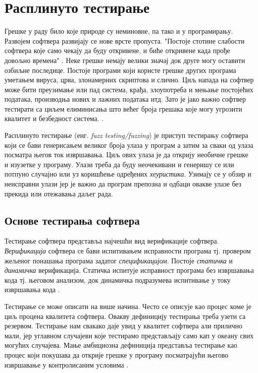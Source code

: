 \documentclass[12pt,oneside]{memoir}
\begin{document}
\chapter{Расплинуто тестирање}

Грешке у раду било које природе су неминовне, па тако и у програмирању. Развојем софтвера развијају се нове врсте пропуста. "Постоје стотине слабости софтвера које само чекају да буду откривене, и биће откривене када прође довољно времена" \cite{fuzzing}. Неке грешке немају велики значај док друге могу оставити озбиљне последице. Постоје програми који користе грешке других програма уметањем вируса, црва, злонамерних скриптова и слично. Циљ напада на софтвер може бити преузимање или пад система, крађа, злоупотреба и мењање постојећих података, производња нових и лажних података итд.  Зато је јако важно софтвер тестирати са циљем елиминисања што већег броја грешака које могу угрозити квалитет и безбедност система. \cite{fuzzing, bezbMalkov}.

Расплинуто тестирање (енг. \textit{fuzz testing/fuzzing}) је приступ тестирању софтвера који се бави генерисањем великог броја улаза у програм а затим за сваки од улаза посматра његов ток извршавања. Циљ ових улаза је да открију необичне грешке и изузетке у програму. Улази треба да буду неочекивани и генеришу се или потпуно случајно или уз коришћење одређених \textit{хеуристика}. Узимају се у обзир и неисправни улази јер је важно да програм препозна и одбаци овакве улазе без прекида или отежавања даљег рада. %

\section{Основе тестирања софтвера}

Тестирање софтвера представља најчешћи вид верификације софтвера. \textit{Верификација} софтвера се бави испитивањем исправности програма тј. провером жељеног понашања програма задатог \textit{спецификацијом}. Постоје \textit{статичка} и \textit{динамичка} верификација. Статичка испитује исправност програма без извршавања кода тј. његовом анализом, док динамичка подразумева испитивање у току извршавања кода \cite{milenaDokt}. 

Тестирање се може описати на више начина. Често се описује као процес коме је циљ процена квалитета софтвера. Овакву дефиницију тестирања треба узети са резервом. Тестирање нам свакако даје увид у квалитет софтвера али прилично мали, јер углавном случајеви које тестирамо представљају само кап у океану свих могућих случајева. Мање амбициозна дефиниција представља тестирање као процес који покушава да открије грешке у програму посматрајући његово извршавање у контролисаним условима \cite{testPrinc}.
\end{document}
